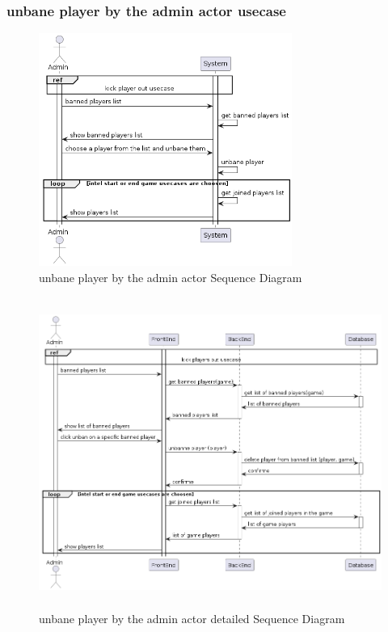 \documentclass{article}
\begin{document}
\subsubsection{unbane player by the admin actor usecase}
 \begin{figure}[H]
	 \centering
	 \includegraphics[height=3in]{../thesis_tex/assets/diagrams/unbane_player_SD.png}
	 \caption{unbane player by the admin actor Sequence Diagram}
\end{figure}

 \begin{figure}[H]
	 \centering
	 \includegraphics[height=4in,width=6in]{../thesis_tex/assets/diagrams/unbane_player_detailedSD.png}
	 \caption{unbane player by the admin actor detailed Sequence Diagram}
\end{figure}
\end{document}
